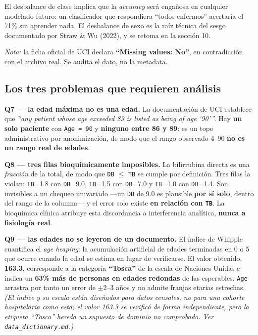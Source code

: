 \documentclass[10pt,a4paper]{article}
\begin{document}
El desbalance de clase implica que la \textit{accuracy} será engañosa en cualquier modelado futuro: un clasificador que respondiera ``todos enfermos'' acertaría el 71\% sin aprender nada. El desbalance de sexo es la raíz técnica del sesgo documentado por Straw \& Wu (2022), y se retoma en la sección 10.

\textit{Nota:} la ficha oficial de UCI declara \textbf{``Missing values: No''}, en contradicción con el archivo real. Se audita el dato, no la metadata.

\subsection{Los tres problemas que requieren análisis}

\textbf{Q7 --- la edad máxima no es una edad.} La documentación de UCI establece que \textit{``any patient whose age exceeded 89 is listed as being of age `90'''}. Hay \textbf{un solo paciente} con \texttt{Age = 90} y \textbf{ninguno entre 86 y 89}: es un tope administrativo por anonimización, de modo que el rango observado 4--90 \textbf{no es un rango real de edades}.

\textbf{Q8 --- tres filas bioquímicamente imposibles.} La bilirrubina directa es una \textit{fracción} de la total, de modo que \texttt{DB} $\leq$ \texttt{TB} se cumple por definición. Tres filas la violan: \texttt{TB}=1.8 con \texttt{DB}=9.0, \texttt{TB}=1.5 con \texttt{DB}=7.0 y \texttt{TB}=1.0 con \texttt{DB}=1.4. Son invisibles a un chequeo univariado ---un \texttt{DB} de 9.0 es plausible \textbf{por sí solo}, dentro del rango de la columna--- y el error solo existe \textbf{en relación con \texttt{TB}}. La bioquímica clínica atribuye esta discordancia a interferencia analítica, \textbf{nunca a fisiología real}.

\textbf{Q9 --- las edades no se leyeron de un documento.} El índice de Whipple cuantifica el \textit{age heaping}: la acumulación artificial de edades terminadas en 0 o 5 que ocurre cuando la edad se estima en lugar de verificarse. El valor obtenido, \textbf{163.3}, corresponde a la categoría \textbf{``Tosca''} de la escala de Naciones Unidas e indica un \textbf{63\% más de personas en edades redondas} de las esperables. \texttt{Age} arrastra por tanto un error de $\pm$2--3 años y no admite franjas etarias estrechas. \textit{(El índice y su escala están diseñados para datos censales, no para una cohorte hospitalaria como esta; el valor 163.3 se verificó de forma independiente, pero la etiqueta ``Tosca'' hereda un supuesto de dominio no comprobado. Ver \texttt{data\_dictionary.md}.)}
\end{document}
